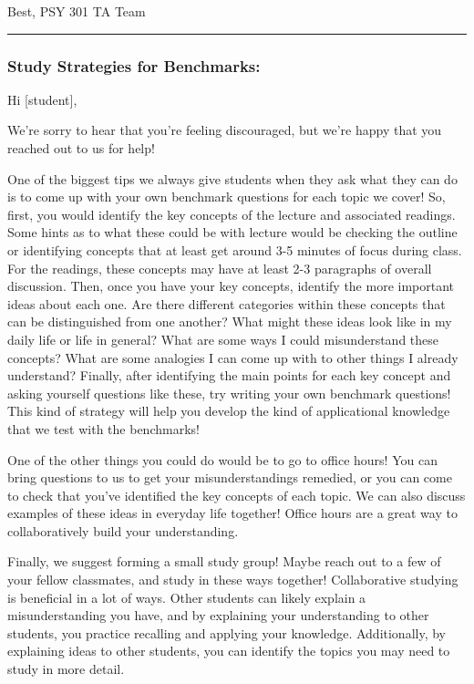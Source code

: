\documentclass[
]{article}
\begin{document}
Best,
PSY 301 TA Team

\begin{center}\rule{0.5\linewidth}{0.5pt}\end{center}

\hypertarget{study-strategies-for-benchmarks}{%
\subsubsection{Study Strategies for Benchmarks:}\label{study-strategies-for-benchmarks}}

Hi {[}student{]},

We're sorry to hear that you're feeling discouraged, but we're happy that you reached out to us for help!

One of the biggest tips we always give students when they ask what they can do is to come up with your own benchmark questions for each topic we cover! So, first, you would identify the key concepts of the lecture and associated readings. Some hints as to what these could be with lecture would be checking the outline or identifying concepts that at least get around 3-5 minutes of focus during class. For the readings, these concepts may have at least 2-3 paragraphs of overall discussion. Then, once you have your key concepts, identify the more important ideas about each one. Are there different categories within these concepts that can be distinguished from one another? What might these ideas look like in my daily life or life in general? What are some ways I could misunderstand these concepts? What are some analogies I can come up with to other things I already understand? Finally, after identifying the main points for each key concept and asking yourself questions like these, try writing your own benchmark questions! This kind of strategy will help you develop the kind of applicational knowledge that we test with the benchmarks!

One of the other things you could do would be to go to office hours! You can bring questions to us to get your misunderstandings remedied, or you can come to check that you've identified the key concepts of each topic. We can also discuss examples of these ideas in everyday life together! Office hours are a great way to collaboratively build your understanding.

Finally, we suggest forming a small study group! Maybe reach out to a few of your fellow classmates, and study in these ways together! Collaborative studying is beneficial in a lot of ways. Other students can likely explain a misunderstanding you have, and by explaining your understanding to other students, you practice recalling and applying your knowledge. Additionally, by explaining ideas to other students, you can identify the topics you may need to study in more detail.
\end{document}
